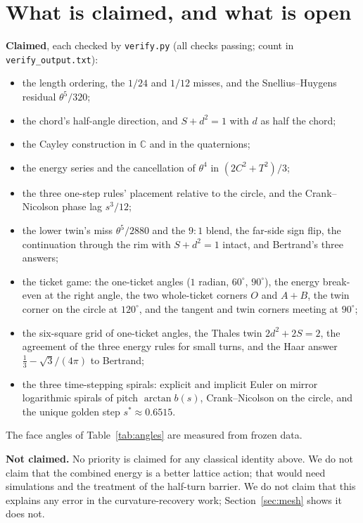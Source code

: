 \documentclass[11pt]{article}
\begin{document}
\section{What is claimed, and what is open}\label{sec:claims}

\textbf{Claimed}, each checked by \texttt{verify.py} (all checks passing; count in \texttt{verify\_output.txt}):
\begin{itemize}
  \item the length ordering, the $1/24$ and $1/12$ misses, and the Snellius--Huygens residual $\theta^5/320$;
  \item the chord's half-angle direction, and $S+d^2=1$ with $d$ as half the chord;
  \item the Cayley construction in $\mathbb{C}$ and in the quaternions;
  \item the energy series and the cancellation of $\theta^4$ in $(2C^2+T^2)/3$;
  \item the three one-step rules' placement relative to the circle, and the Crank--Nicolson phase lag $s^3/12$;
  \item the lower twin's miss $\theta^5/2880$ and the $9{:}1$ blend, the far-side sign flip, the
    continuation through the rim with $S+d^2=1$ intact, and Bertrand's three answers;
  \item the ticket game: the one-ticket angles ($1$ radian, $60^\circ$, $90^\circ$), the
    energy break-even at the right angle, the two whole-ticket corners $O$ and $A+B$, the
    twin corner on the circle at $120^\circ$, and the tangent and twin corners meeting at $90^\circ$;
  \item the six-square grid of one-ticket angles, the Thales twin $2d^2+2S=2$, the agreement of
    the three energy rules for small turns, and the Haar answer $\tfrac13-\sqrt3/(4\pi)$ to Bertrand;
  \item the three time-stepping spirals: explicit and implicit Euler on mirror logarithmic spirals
    of pitch $\arctan b(s)$, Crank--Nicolson on the circle, and the unique golden step $s^\ast\approx0.6515$.
\end{itemize}
The face angles of Table~\ref{tab:angles} are measured from frozen data.

\textbf{Not claimed.} No priority is claimed for any classical identity above. We do not claim that
the combined energy is a better lattice action; that would need simulations and the
treatment of the half-turn barrier. We do not claim that this explains any error in the
curvature-recovery work; Section~\ref{sec:mesh} shows it does not.
\end{document}

